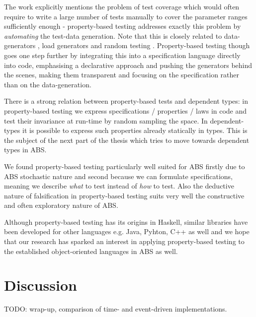 The work \cite{onggo_test-driven_2016} explicitly mentions the problem of test coverage which would often require to write a large number of tests manually to cover the parameter ranges sufficiently enough - property-based testing addresses exactly this problem by \textit{automating} the test-data generation. Note that this is closely related to data-generators \cite{gurcan_generic_2013}, load generators and random testing \cite{burnstein_practical_2010}. Property-based testing though goes one step further by integrating this into a specification language directly into code, emphasising a declarative approach and pushing the generators behind the scenes, making them transparent and focusing on the specification rather than on the data-generation. 





There is a strong relation between property-based tests and dependent types: in property-based testing we express specifications / properties / laws in code and test their invariance at run-time by random sampling the space. In dependent-types it is possible to express such properties already statically in types. This is the subject of the next part of the thesis which tries to move towards dependent types in ABS.

We found property-based testing particularly well suited for ABS firstly due to ABS stochastic nature and second because we can formulate specifications, meaning we describe \textit{what} to test instead of \textit{how} to test. Also the deductive nature of falsification in property-based testing suits very well the constructive and often exploratory nature of ABS. 

Although property-based testing has its origins in Haskell, similar libraries have been developed for other languages e.g. Java, Pyhton, C++ as well and we hope that our research has sparked an interest in applying property-based testing to the established object-oriented languages in ABS as well.











\chapter*{Discussion}
TODO: wrap-up, comparison of time- and event-driven implementations.

